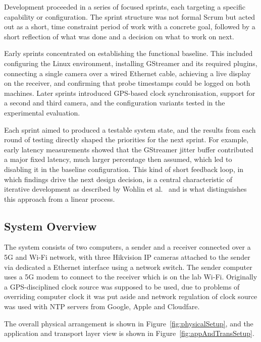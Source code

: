 Development proceeded in a series of focused sprints, each targeting a specific capability or configuration. The sprint structure was not formal Scrum but acted out as a short, time constraint period of work with a concrete goal, followed by a short reflection of what was done and a decision on what to work on next.

Early sprints concentrated on establishing the functional baseline. This included configuring the Linux environment, installing GStreamer and its required plugins, connecting a single camera over a wired Ethernet cable, achieving a live display on the receiver, and confirming that probe timestamps could be logged on both machines. Later sprints introduced GPS-based clock synchronisation, support for a second and third camera, and the configuration variants tested in the experimental evaluation.

Each sprint aimed to produced a testable system state, and the results from each round of testing directly shaped the priorities for the next sprint. For example, early latency measurements showed that the GStreamer jitter buffer contributed a major fixed latency, much larger percentage then assumed, which led to disabling it in the baseline configuration. This kind of short feedback loop, in which findings drive the next design decision, is a central characteristic of iterative development as described by Wohlin et al.~\cite{wohlin2012} and is what distinguishes this approach from a linear process.


\subsection{System Overview}

The system consists of two computers, a sender and a receiver connected over a 5G and Wi-Fi network, with three Hikvision IP cameras attached to the sender via dedicated a Ethernet interface using a network switch. The sender computer uses a 5G modem to connect to the receiver which is on the lab Wi-Fi. Originally a GPS-disciplined clock source was supposed to be used, due to problems of overriding computer clock it was put aside and network regulation of clock source was used with NTP servers from Google, Apple and Cloudfare.

The overall physical arrangement is shown in Figure~\ref{fig:physicalSetup}, and the application and transport layer view is shown in Figure~\ref{fig:appAndTransSetup}.

